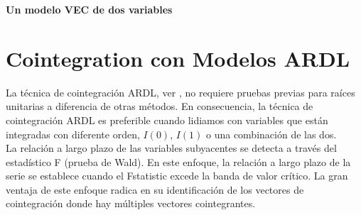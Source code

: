 	
	\textbf{Un modelo VEC de dos variables}
	
	\begin{figure}[H]
	\end{figure}
	\begin{figure}[H]
	\end{figure}
	



\section{Cointegration con Modelos ARDL}
	La t\'ecnica de cointegraci\'on ARDL, ver \cite{pesaran2001bounds}, no requiere pruebas previas para ra\'{i}ces unitarias a diferencia de otras m\'etodos. En consecuencia, la t\'ecnica de cointegración ARDL es preferible cuando lidiamos con variables que est\'an integradas con diferente orden, $I(0)$, $I(1)$ o una combinaci\'on de las dos.\\
	La relaci\'on a largo plazo de las variables subyacentes se detecta a trav\'es del estad\'{i}stico F (prueba de Wald). En este enfoque, la relaci\'on a largo plazo de la serie se establece cuando el Fstatistic excede la banda de valor cr\'{i}tico. La gran ventaja de este enfoque radica en su identificaci\'on de los vectores de cointegraci\'on donde hay m\'ultiples vectores cointegrantes.
	
